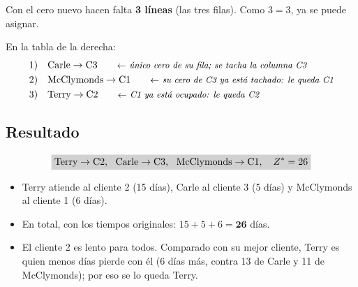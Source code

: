 \documentclass[11pt,a4paper]{article}
\let\pasobase\paso
\renewcommand{\paso}[1]{\needspace{7\baselineskip}\pasobase{#1}}
\newcommand{\marco}[3]{%
  \foreach \i in {2,...,#2} \foreach \j in {2,...,#3}
    \draw[gray!60, very thin] (#1-\i-\j.north west) rectangle (#1-\i-\j.south east);
  \draw[semithick] (#1-2-2.north west) rectangle (#1-#2-#3.south east);}
\newcommand{\tfila}[3]{\draw[tapa] (#1-#2-2.west) -- (#1-#2-#3.east);}
\newcommand{\pie}[2]{\node[below=1.5mm of #1, font=\scriptsize\itshape] {#2};}
\newcommand{\cero}[1]{\node[asig] at (#1) {};}
\newcommand{\flecha}[3]{\draw[-{Stealth[length=2.4mm]}, thick, shorten >=1mm] (#1.east) -- node[above, font=\scriptsize, align=center] {#3} (#1.east -| #2.west);}
\begin{document}
\begin{center}
\end{center}
Con el cero nuevo hacen falta \textbf{3 líneas} (las tres filas). Como $3 = 3$, ya se puede asignar.

En la tabla de la derecha:
\begin{align*}
1)\quad & \text{Carle} \to \text{C3} \nota{único cero de su fila; se tacha la columna C3}\\
2)\quad & \text{McClymonds} \to \text{C1} \nota{su cero de C3 ya está tachado: le queda C1}\\
3)\quad & \text{Terry} \to \text{C2} \nota{C1 ya está ocupado: le queda C2}
\end{align*}

\subsection*{Resultado}
\[
\res{\text{Terry} \to \text{C2},\ \ \text{Carle} \to \text{C3},\ \ \text{McClymonds} \to \text{C1},\quad Z^* = 26}
\]
\begin{itemize}[itemsep=2pt]
  \item Terry atiende al cliente 2 (15 días), Carle al cliente 3 (5 días) y McClymonds al cliente 1 (6 días).
  \item En total, con los tiempos originales: $15 + 5 + 6 = \mathbf{26}$ días.
  \item El cliente 2 es lento para todos. Comparado con su mejor cliente, Terry es quien menos días pierde con él
        (6 días más, contra 13 de Carle y 11 de McClymonds); por eso se lo queda Terry.
\end{itemize}
\end{document}
